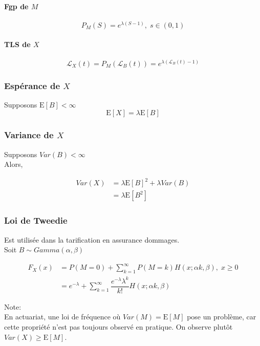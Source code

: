 \paragraph*{Fgp de \(M\)}\label{fgp-de-m-1}

\[P_M(S)=e^{\lambda(S-1)},\;s \in (0,1)\]

\paragraph*{TLS de \(X\)}\label{tls-de-x-2}

\[\mathcal{L}_X(t)=P_M\left (\mathcal{L}_B(t)\right )= e^{\lambda\left (\mathcal{L}_B(t)-1\right )}\]

\subsubsection*{Espérance de \(X\)}\label{esperance-de-x-2}

Supposons \(\text{E}[B]<\infty\) \[
\text{E}[X]=\lambda\text{E}[B]
\]

\subsubsection*{Variance de \(X\)}\label{variance-de-x-2}

Supposons \(Var(B)<\infty\)\\
Alors,

\begin{align*}
Var(X) &= \lambda\text{E}[B]^2+\lambda Var(B)\\
& =\lambda\text{E}[B^2]
\end{align*}

\subsubsection{Loi de Tweedie}\label{loi-de-tweedie}

Est utilisée dans la tarification en assurance dommages.\\
Soit \(B \sim Gamma(\alpha,\beta)\)

\begin{align*}
F_X(x)& = P(M=0)+\sum^\infty_{k=1} P(M=k) H(x;\alpha k,\beta),\;x \geq 0\\
& = e^{-\lambda} +\sum^\infty_{k=1} \dfrac{e^{-\lambda}\lambda^k}{k!}H(x;\alpha k,\beta) 
\end{align*}

Note:\\
En actuariat, une loi de fréquence où \(Var(M)=\text{E}[M]\) pose un
problème, car cette propriété n'est pas toujours observé en pratique. On
observe plutôt \(Var(X) \geq \text{E}[M]\).

